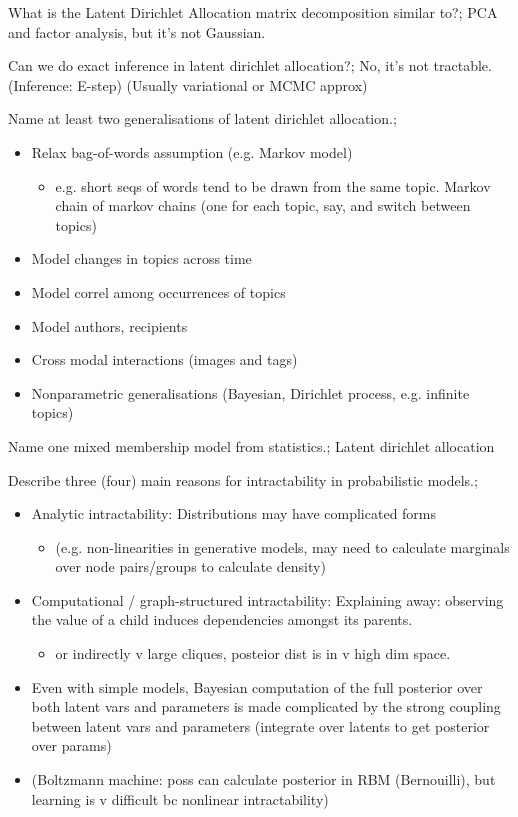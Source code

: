 \documentclass{article}
\begin{document}
What is the Latent Dirichlet Allocation matrix decomposition similar to?; PCA and factor analysis, but it's not Gaussian.

Can we do exact inference in latent dirichlet allocation?; No, it's not tractable. (Inference: E-step) (Usually variational or MCMC approx)

Name at least two generalisations of latent dirichlet allocation.; \begin{itemize}
    \item Relax bag-of-words assumption (e.g. Markov model) \begin{itemize}
        \item e.g. short seqs of words tend to be drawn from the same topic. Markov chain of markov chains (one for each topic, say, and switch between topics)
    \end{itemize}
    \item Model changes in topics across time
    \item Model correl among occurrences of topics
    \item Model authors, recipients
    \item Cross modal interactions (images and tags)
    \item Nonparametric generalisations (Bayesian, Dirichlet process, e.g. infinite topics)
\end{itemize}

Name one mixed membership model from statistics.; Latent dirichlet allocation





Describe three (four) main reasons for intractability in probabilistic models.; \begin{itemize}
    \item Analytic intractability: Distributions may have complicated forms \begin{itemize}
        \item (e.g. non-linearities in generative models, may need to calculate marginals over node pairs/groups to calculate density)
    \end{itemize}
    \item Computational / graph-structured intractability: Explaining away: observing the value of a child induces dependencies amongst its parents.
    \begin{itemize}
        \item or indirectly v large cliques, posteior dist is in v high dim space.
    \end{itemize}
    \item Even with simple models, Bayesian computation of the full posterior over both latent vars and parameters is made complicated by the strong coupling between latent vars and parameters (integrate over latents to get posterior over params)
    \item (Boltzmann machine: poss can calculate posterior in RBM (Bernouilli), but learning is v difficult bc nonlinear intractability)
\end{itemize}
\end{document}
